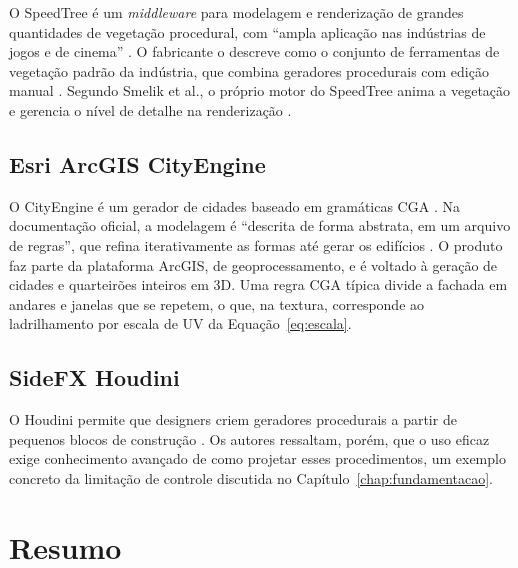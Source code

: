 O SpeedTree é um \textit{middleware} para modelagem e renderização de grandes quantidades de vegetação procedural, com ``ampla aplicação nas indústrias de jogos e de cinema'' \cite[p.~11]{smelik2014}. O fabricante o descreve como o conjunto de ferramentas de vegetação padrão da indústria, que combina geradores procedurais com edição manual \cite{speedtree}. Segundo Smelik et al., o próprio motor do SpeedTree anima a vegetação e gerencia o nível de detalhe na renderização \cite[p.~11]{smelik2014}.

\subsection{Esri ArcGIS CityEngine}

O CityEngine é um gerador de cidades baseado em gramáticas CGA \cite[p.~12]{smelik2014}. Na documentação oficial, a modelagem é ``descrita de forma abstrata, em um arquivo de regras'', que refina iterativamente as formas até gerar os edifícios \cite{cityengine}. O produto faz parte da plataforma ArcGIS, de geoprocessamento, e é voltado à geração de cidades e quarteirões inteiros em 3D. Uma regra CGA típica divide a fachada em andares e janelas que se repetem, o que, na textura, corresponde ao ladrilhamento por escala de UV da Equação~\eqref{eq:escala}.

\subsection{SideFX Houdini}

O Houdini permite que designers criem geradores procedurais a partir de pequenos blocos de construção \cite[p.~12]{smelik2014}. Os autores ressaltam, porém, que o uso eficaz exige conhecimento avançado de como projetar esses procedimentos, um exemplo concreto da limitação de controle discutida no Capítulo~\ref{chap:fundamentacao}.

\section{Resumo}

